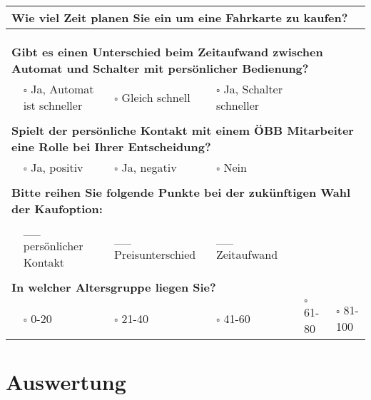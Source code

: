 \documentclass[]{article}
\begin{document}
\begin{landscape}
\begin{table}[h!]
\begin{tabular}{|llllll|}
		\multicolumn{6}{|l|}{\textbf{Wie viel Zeit planen Sie ein um eine Fahrkarte zu kaufen?}}                                            \\ \hline
		\multicolumn{6}{|l|}{}                                                                                                              \\
		& & & & & \\ \hline
		& & & & & \\
		\multicolumn{6}{|l|}{\textbf{Gibt es einen Unterschied beim Zeitaufwand zwischen Automat und Schalter mit persönlicher Bedienung?}} \\ \hline
		& $\square$ Ja, Automat ist schneller & $\square$ Gleich schnell & $\square$ Ja, Schalter schneller &  &                            \\ \hline
		& & & & & \\
		\multicolumn{6}{|l|}{\textbf{Spielt der persönliche Kontakt mit einem ÖBB Mitarbeiter eine Rolle bei Ihrer Entscheidung?}}          \\ \hline
		& $\square$ Ja, positiv & $\square$ Ja, negativ & $\square$ Nein &  &                                                               \\ \hline
		& & & & & \\
		\multicolumn{6}{|l|}{\textbf{Bitte reihen Sie folgende Punkte bei der zukünftigen Wahl der Kaufoption:}}                            \\ \hline
		& \_\_ persönlicher Kontakt       & \_\_ Preisunterschied          & \_\_ Zeitaufwand             &  &                              \\ \hline
		& & & & & \\
		\multicolumn{6}{|l|}{\textbf{In welcher Altersgruppe liegen Sie?}}                                                                  \\ \hline
		& $\square$ 0-20 & $\square$ 21-40 & $\square$ 41-60 & $\square$ 61-80 & $\square$ 81-100                                           \\ \hline
	\end{tabular}
\end{table}

\end{landscape}
\newpage
\restoregeometry

\section{Auswertung}
\label{sec:auswertung}
\end{document}
